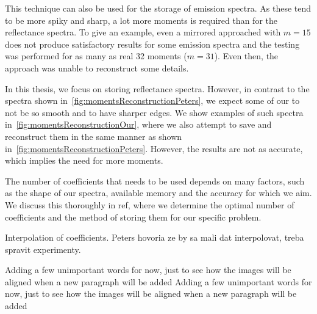 This technique can also be used for the storage of emission spectra. As these tend to be more spiky and sharp, a lot more moments is required than for the reflectance spectra. To give an example, even a mirrored approached with $m=15$ does not produce satisfactory results for some emission spectra and the testing was performed for as many as real 32 moments ($m=31$). Even then, the approach was unable to reconstruct some details.

In this thesis, we focus on storing reflectance spectra. However, in contrast to the spectra shown in~\cref{fig:momentsReconstructionPeters}, we expect some of our to not be so smooth and to have sharper edges. We show examples of such spectra in~\cref{fig:momentsReconstructionOur}, where we also attempt to save and reconstruct them in the same manner as shown in~\cref{fig:momentsReconstructionPeters}. However, the results are not as accurate, which implies the need for more moments.

The number of coefficients that needs to be used depends on many factors, such as the shape of our spectra, available memory and the accuracy for which we aim. We discuss this thoroughly in ref, where we determine the optimal number of coefficients and the method of storing them for our specific problem.

Interpolation of coefficients. Peters hovoria ze by sa mali dat interpolovat, treba spravit experimenty.

Adding a few unimportant words for now, just to see how the images will be aligned when a new paragraph will be added Adding a few unimportant words for now, just to see how the images will be aligned when a new paragraph will be added

